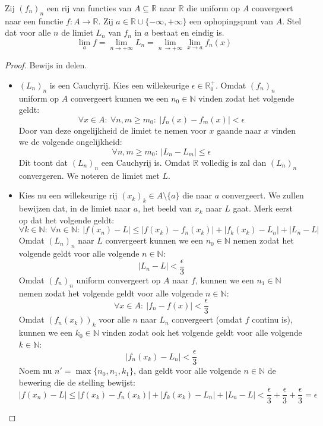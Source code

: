 \documentclass[main.tex]{subfiles}
\begin{document}
\begin{st}
  Zij $(f_{n})_{n}$ een rij van functies van $A \subseteq \mathbb{R}$ naar $\mathbb{R}$ die uniform op $A$ convergeert naar een functie $f: A \rightarrow \mathbb{R}$.
  Zij $a\in \mathbb{R} \cup \{-\infty,+\infty\}$ een ophopingspunt van $A$.
  Stel dat voor alle $n$ de limiet $L_{n}$ van $f_{n}$ in $a$ bestaat en eindig is.
  \[ \lim_{a}f = \lim_{n \rightarrow +\infty} L_{n} = \lim_{n\ \rightarrow +\infty} \lim_{x \rightarrow a} f_{n}(x) \]

  \begin{proof}
    Bewijs in delen.
    \begin{itemize}
    \item $(L_{n})_{n}$ is een Cauchyrij.
      Kies een willekeurige $\epsilon \in \mathbb{R}_{0}^{+}$.
      Omdat $(f_{n})_{n}$ uniform op $A$ convergeert kunnen we een $n_{0}\in \mathbb{N}$ vinden zodat het volgende geldt:
      \[ \forall x\in A:\ \forall n,m \ge m_{0}:\ |f_{n}(x) -f_{m}(x)| < \epsilon \]
      Door van deze ongelijkheid de limiet te nemen voor $x$ gaande naar $x$ vinden we de volgende ongelijkheid:
      \[ \forall n,m \ge m_{0}:\ |L_{n}-L_{m}| \le \epsilon \]
      Dit toont dat $(L_{n})_{n}$ een Cauchyrij is.
      Omdat $\mathbb{R}$ volledig is zal dan $(L_{n})_{n}$ convergeren.
      We noteren de limiet met $L$.
    \item 
      Kies nu een willekeurige rij $(x_{k})_{k} \in A\setminus \{a\}$ die naar $a$ convergeert.
      We zullen bewijzen dat, in de limiet naar $a$, het beeld van $x_{k}$ naar $L$ gaat.
      Merk eerst op dat het volgende geldt:
      \[ \forall k\in \mathbb{N}:\ \forall n\in \mathbb{N}:\ |f(x_{n})-L| \le |f(x_{k}) -f_{n}(x_{k})| + |f_{k}(x_{k})-L_{n}| + |L_{n}-L| \]
      Omdat $(L_{n})_{n}$ naar $L$ convergeert kunnen we een $n_{0}\in\mathbb{N}$ nemen zodat het volgende geldt voor alle volgende $n\in \mathbb{N}$:
      \[ |L_{n}-L| < \frac{\epsilon}{3} \]
      Omdat $(f_{n})_{n}$ uniform convergeert op $A$ naar $f$, kunnen we een $n_{1}\in \mathbb{N}$ nemen zodat het volgende geldt voor alle volgende $n\in \mathbb{N}$:
      \[ \forall x\in A:\ |f_{n}-f(x)| < \frac{\epsilon}{3} \]
      Omdat $(f_{n}(x_{k}))_{k}$ voor alle $n$ naar $L_{n}$ convergeert (omdat $f$ continu is), kunnen we een $k_{0} \in \mathbb{N}$ vinden zodat ook het volgende geldt voor alle volgende $k \in \mathbb{N}$:
      \[ |f_{n}(x_{k}) - L_{n}| < \frac{\epsilon}{3} \]
      Noem nu $n' = \max\{n_{0},n_{1},k_{1}\}$, dan geldt voor alle volgende $n\in \mathbb{N}$ de bewering die de stelling bewijst:
      \[ |f(x_{n})-L| \le |f(x_{k}) -f_{n}(x_{k})| + |f_{k}(x_{k})-L_{n}| + |L_{n}-L| < \frac{\epsilon}{3} + \frac{\epsilon}{3} + \frac{\epsilon}{3} = \epsilon \]
    \end{itemize}
  \end{proof}
\end{st}
\end{document}

